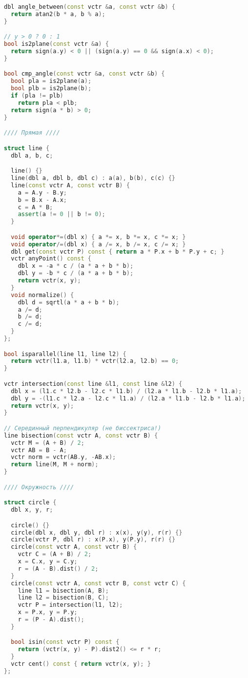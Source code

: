 \documentclass[10pt,a4paper,landscape,twosided]{extarticle}
\begin{document}
\begin{multicols*}{3}
\begin{lstlisting}[language=C++]
dbl angle_between(const vctr &a, const vctr &b) {
  return atan2(b * a, b % a);
}

// y > 0 ? 0 : 1
bool is2plane(const vctr &a) {
  return sign(a.y) < 0 || (sign(a.y) == 0 && sign(a.x) < 0);
}

bool cmp_angle(const vctr &a, const vctr &b) {
  bool pla = is2plane(a);
  bool plb = is2plane(b);
  if (pla != plb)
    return pla < plb;
  return sign(a * b) > 0;
}

//// Прямая ////

struct line {
  dbl a, b, c;

  line() {}
  line(dbl a, dbl b, dbl c) : a(a), b(b), c(c) {}
  line(const vctr A, const vctr B) {
    a = A.y - B.y;
    b = B.x - A.x;
    c = A * B;
    assert(a != 0 || b != 0);
  }

  void operator*=(dbl x) { a *= x, b *= x, c *= x; }
  void operator/=(dbl x) { a /= x, b /= x, c /= x; }
  dbl get(const vctr P) const { return a * P.x + b * P.y + c; }
  vctr anyPoint() const {
    dbl x = -a * c / (a * a + b * b);
    dbl y = -b * c / (a * a + b * b);
    return vctr(x, y);
  }
  void normalize() {
    dbl d = sqrtl(a * a + b * b);
    a /= d;
    b /= d;
    c /= d;
  }
};

bool isparallel(line l1, line l2) {
  return vctr(l1.a, l1.b) * vctr(l2.a, l2.b) == 0;
}

vctr intersection(const line &l1, const line &l2) {
  dbl x = (l1.c * l2.b - l2.c * l1.b) / (l2.a * l1.b - l2.b * l1.a);
  dbl y = -(l1.c * l2.a - l2.c * l1.a) / (l2.a * l1.b - l2.b * l1.a);
  return vctr(x, y);
}

// Серединный перпендикуляр (не биссектриса!)
line bisection(const vctr A, const vctr B) {
  vctr M = (A + B) / 2;
  vctr AB = B - A;
  vctr norm = vctr(AB.y, -AB.x);
  return line(M, M + norm);
}

//// Окружность ////

struct circle {
  dbl x, y, r;

  circle() {}
  circle(dbl x, dbl y, dbl r) : x(x), y(y), r(r) {}
  circle(vctr P, dbl r) : x(P.x), y(P.y), r(r) {}
  circle(const vctr A, const vctr B) {
    vctr C = (A + B) / 2;
    x = C.x, y = C.y;
    r = (A - B).dist() / 2;
  }
  circle(const vctr A, const vctr B, const vctr C) {
    line l1 = bisection(A, B);
    line l2 = bisection(B, C);
    vctr P = intersection(l1, l2);
    x = P.x, y = P.y;
    r = (P - A).dist();
  }

  bool isin(const vctr P) const {
    return (vctr(x, y) - P).dist2() <= r * r;
  }
  vctr cent() const { return vctr(x, y); }
};



\end{lstlisting}
\end{multicols*}
\end{document}
